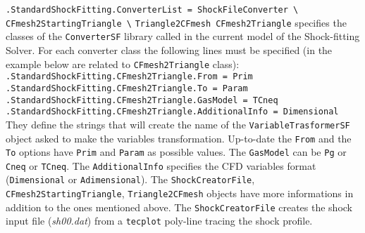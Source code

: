 \documentclass[11pt,a4paper,oneside]{article}
\begin{document}
\hspace*{1cm} \texttt{.StandardShockFitting.ConverterList = ShockFileConverter \textbackslash{}}
\newline
\hspace*{8.6cm} \texttt{CFmesh2StartingTriangle \textbackslash{}}
\newline
\hspace*{8.6cm} \texttt{Triangle2CFmesh CFmesh2Triangle}
\newline
\newline
specifies the classes of the \texttt{ConverterSF} library called in the current model of the Shock-fitting Solver. For each converter class the following lines must be specified (in the example below are related to \texttt{CFmesh2Triangle} class):
\newline
\newline
\hspace*{1cm} \texttt{.StandardShockFitting.CFmesh2Triangle.From = Prim}
\newline
\hspace*{1cm} \texttt{.StandardShockFitting.CFmesh2Triangle.To = Param}
\newline
\hspace*{1cm} \texttt{.StandardShockFitting.CFmesh2Triangle.GasModel = TCneq}
\newline
\hspace*{1cm} \texttt{.StandardShockFitting.CFmesh2Triangle.AdditionalInfo = Dimensional}
\newline
\newline
They define the strings that will create the name of the \texttt{VariableTrasformerSF} object asked to make the variables transformation. 
\newline
\newline
Up-to-date the \texttt{From} and the \texttt{To} options have \texttt{Prim} and \texttt{Param} as possible values. 
\newline
The \texttt{GasModel} can be \texttt{Pg} or \texttt{Cneq} or \texttt{TCneq}. 
\newline
The \texttt{AdditionalInfo} specifies the CFD variables format (\texttt{Dimensional} or \texttt{Adimensional}).
\newline
\newline
The \texttt{ShockCreatorFile}, \texttt{CFmesh2StartingTriangle}, \texttt{Triangle2CFmesh} objects have more informations in addition to the ones mentioned above.
\newline
The \texttt{ShockCreatorFile} creates the shock input file (\textit{sh00.dat}) from a \texttt{tecplot} poly-line tracing the shock profile.
\end{document}
